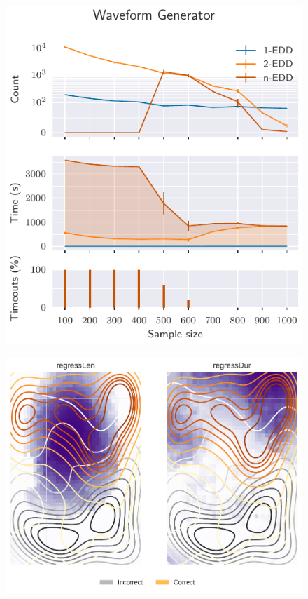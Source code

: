 \documentclass[10pt]{beamer}
\begin{document}
\begin{frame}{}
\begin{figure}
    \centering
    \includegraphics[height=\textheight]{scalability_sample_wave.pdf}
\end{figure}
\end{frame}

\begin{frame}{}
\begin{figure}
    \centering
    \includegraphics[height=\textheight]{eye_regress-eps-converted-to.pdf}
\end{figure}
\end{frame}
\end{document}
